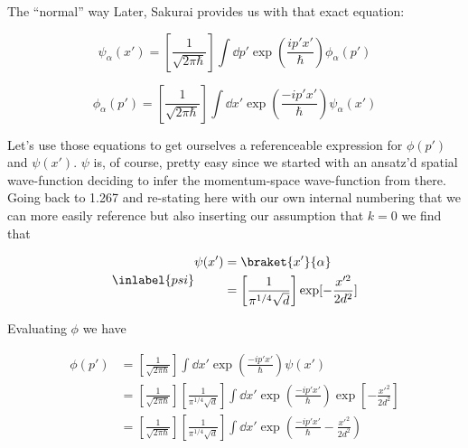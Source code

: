 \begin{answer}
\begin{answerpart}{The ``normal'' way}
    Later, Sakurai provides us with that exact equation:
    
    \begin{equation}
      \tag{1.266a}
      \psi_{\alpha}(x')
      = \left[ \frac{1}{\sqrt{2\pi\hbar}} \right]
      \int \dd{p'} \exp(\frac{ip'x'}{\hbar})\phi_{\alpha}(p')
    \end{equation}

    \begin{equation}
      \tag{1.266b}
      \phi_{\alpha}(p')
      = \left[ \frac{1}{\sqrt{2\pi\hbar}} \right]
      \int \dd{x'} \exp(\frac{-ip'x'}{\hbar})\psi_{\alpha}(x')
    \end{equation}

    Let's use those equations to get ourselves a referenceable
    expression for $\phi(p')$ and $\psi(x')$.  $\psi$ is, of course,
    pretty easy since we started with an ansatz'd spatial
    wave-function deciding to infer the momentum-space wave-function
    from there.  Going back to 1.267 and re-stating here with our own
    internal numbering that we can more easily reference but also
    inserting our assumption that $k=0$ we find that

    \begin{equation}
      \inlabel{psi}
      \begin{split}
        \psi(x')
        &= \braket{x'}{\alpha}\\
        &= \left[\frac{1}{\pi^{1/4}\sqrt{d}}\right]
        \exp[-\frac{x'^{2}}{2d^2}]\\
      \end{split}
    \end{equation}
    
    Evaluating $\phi$ we have

    \begin{equation}
      \begin{split}
        \phi(p')
        &= 
        \left[ \frac{1}{\sqrt{2\pi\hbar}} \right]
        \int \dd{x'} \exp(\frac{-ip'x'}{\hbar})\psi(x')
        \\
        &= 
        \left[ \frac{1}{\sqrt{2\pi\hbar}} \right]
        \left[\frac{1}{\pi^{1/4}\sqrt{d}}\right]
        \int \dd{x'}
        \exp(\frac{-ip'x'}{\hbar})
        \exp[-\frac{x'^{2}}{2d^2}]
        \\
        &= 
        \left[ \frac{1}{\sqrt{2\pi\hbar}} \right]
        \left[\frac{1}{\pi^{1/4}\sqrt{d}}\right]
        \int \dd{x'}
        \exp(\frac{-ip'x'}{\hbar}
        - \frac{x'^{2}}{2d^2})
        \\
      \end{split}
    \end{equation}


\end{answerpart}
\end{answer}
